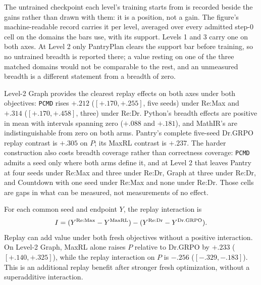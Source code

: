 \documentclass{article}
\makeatletter
\newcommand{\1}{\mathbf 1}
\newcommand{\pmd}{\texttt{PCMD}}
\newcommand{\distk}{\texttt{distinct@8}}
\theoremstyle{remark}
\theoremstyle{definition}
\theoremstyle{plain}
\makeatother
\begin{document}
The untrained checkpoint each level's training starts from is recorded beside
the gains rather than drawn with them: it is a position, not a gain. The figure's machine-readable record carries it per level, averaged over every
admitted step-0 cell on the domains the bars use, with its support. Levels 1 and 3 carry one on both
axes. At Level 2 only PantryPlan clears the support bar before training, so no
untrained breadth is reported there; a value resting on one of the three
matched domains would not be comparable to the rest, and an unmeasured breadth
is a different statement from a breadth of zero.

Level-2 Graph provides the clearest replay effects on both axes under both
objectives: \pmd{} rises $+.212$ ($[+.170,+.255]$, five seeds) under Re:Max and
$+.314$ ($[+.170,+.458]$, three) under Re:Dr. Python's breadth effects are
positive in mean with intervals spanning zero ($+.088$ and $+.181$), and
MathIR's are indistinguishable from zero on both arms. Pantry's complete
five-seed Dr.GRPO replay contrast is $+.305$ on $P$; its MaxRL contrast is
$+.237$. The harder construction also costs breadth coverage rather than
correctness coverage: \pmd{} admits a seed only where both arms define it, and
at Level 2 that leaves Pantry at four seeds under Re:Max and three under Re:Dr,
Graph at three under Re:Dr, and Countdown with one seed under Re:Max and none
under Re:Dr. Those cells are gaps in what can be measured, not measurements of
no effect.

For each common seed and endpoint $Y$, the replay interaction is
\[
 I=(Y^{\rm Re:Max}-Y^{\rm MaxRL})
    -(Y^{\rm Re:Dr}-Y^{\rm Dr.GRPO}).
\]
Replay can add value under both fresh objectives without a positive
interaction. On Level-2 Graph, MaxRL alone raises $P$ relative to Dr.GRPO
by $+.233$ ($[+.140,+.325]$), while the replay interaction on $P$ is
$-.256$ ($[-.329,-.183]$). This is an additional replay benefit after
stronger fresh optimization, without a superadditive interaction.

\begin{table}[!htbp]
  \centering
  \caption{\textbf{Fresh-objective effects and replay interactions on Level 2.}
  All three contrasts within a domain use the same four-arm seed
  intersection. The interaction is
  $(\mathrm{Re:Max}-\mathrm{MaxRL})-
  (\mathrm{Re:Dr}-\mathrm{Dr.GRPO})$.
  Each entry gives its mean and, only for a complete five-seed block, a
  paired unadjusted 95\% Student-$t$ interval. This is the one table that keeps
  the \distk{} axis: an interaction needs both differences on the same seed, and
  at Level 2 the seeds where all four arms define \pmd{} number five only on
  Python, four on MathIR, three on Graph, two on PantryPlan and none on
  Countdown --- too thin to carry the estimand.}
  \label{tab:level2-factorial-contrasts}
  \scriptsize
  \setlength{\tabcolsep}{3pt}
\end{table}
\end{document}
